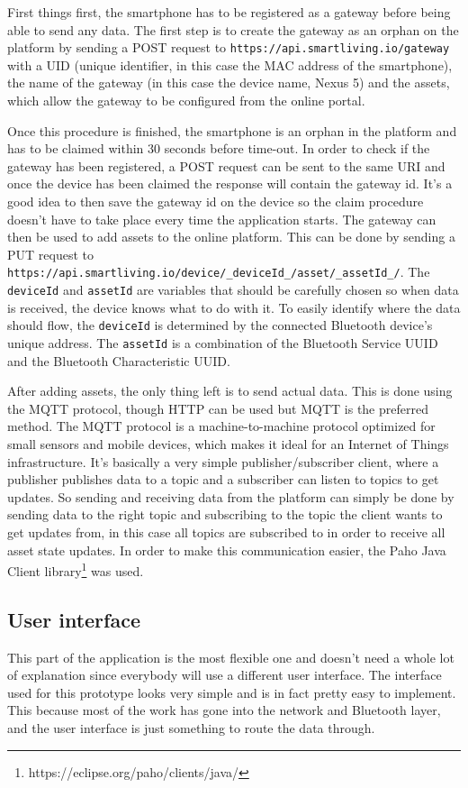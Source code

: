 \documentclass[pdftex,a4paper,12pt,twoside]{report}
\begin{document}
First things first, the smartphone has to be registered as a gateway before being able to send any data. The first step is to create the gateway as an orphan on the platform by sending a POST request to \texttt{https://api.smartliving.io/gateway} with a UID (unique identifier, in this case the MAC address of the smartphone), the name of the gateway (in this case the device name, Nexus 5) and the assets, which allow the gateway to be configured from the online portal.

Once this procedure is finished, the smartphone is an orphan in the platform and has to be claimed within 30 seconds before time-out. In order to check if the gateway has been registered, a POST request can be sent to the same URI and once the device has been claimed the response will contain the gateway id. It's a good idea to then save the gateway id on the device so the claim procedure doesn't have to take place every time the application starts. The gateway can then be used to add assets to the online platform. This can be done by sending a PUT request to \texttt{https://api.smartliving.io/device/\_deviceId\_/asset/\_assetId\_/}. The \texttt{deviceId} and \texttt{assetId} are variables that should be carefully chosen so when data is received, the device knows what to do with it. To easily identify where the data should flow, the \texttt{deviceId} is determined by the connected Bluetooth device's unique address. The \texttt{assetId} is a combination of the Bluetooth Service UUID and the Bluetooth Characteristic UUID.

After adding assets, the only thing left is to send actual data. This is done using the MQTT protocol, though HTTP can be used but MQTT is the preferred method. The MQTT protocol is a machine-to-machine protocol optimized for small sensors and mobile devices, which makes it ideal for an Internet of Things infrastructure. It's basically a very simple publisher/subscriber client, where a publisher publishes data to a topic and a subscriber can listen to topics to get updates. So sending and receiving data from the platform can simply be done by sending data to the right topic and subscribing to the topic the client wants to get updates from, in this case all topics are subscribed to in order to receive all asset state updates. In order to make this communication easier, the Paho Java Client library\footnote{https://eclipse.org/paho/clients/java/} was used.

\subsection{User interface}
\label{subsec:userinterface}
This part of the application is the most flexible one and doesn't need a whole lot of explanation since everybody will use a different user interface. The interface used for this prototype looks very simple and is in fact pretty easy to implement. This because most of the work has gone into the network and Bluetooth layer, and the user interface is just something to route the data through.
\end{document}
